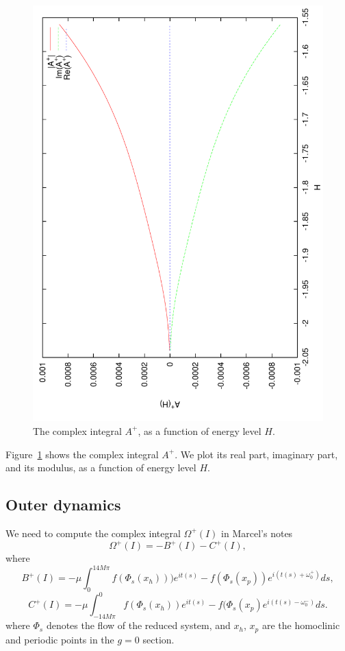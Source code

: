 \documentclass[a4paper]{amsart}
\theoremstyle{remark}
\begin{document}
\begin{figure}
\includegraphics[angle=-90,width=\textwidth]{figs/inner_ell}
\caption{The complex integral $A^+$, as a function of energy level
$H$.}
\label{fig:inner_ell}
\end{figure}

Figure~\ref{fig:inner_ell} shows the complex integral $A^+$. We plot
its real part, imaginary part, and its modulus, as a function of
energy level $H$.

\subsection{Outer dynamics}

We need to compute the complex integral $\Omega^+(I)$ in Marcel's notes
\[ \Omega^+(I) = -B^+(I) - C^+(I), \]
where 
\[ B^+(I) = -\mu \int_0^{14M\pi} 
   f(\Phi_s(x_h))) e^{it(s)} - f(\Phi_s(x_p)) e^{i(t(s)+\omega_0^+)} ds, \]
\[ C^+(I) = -\mu \int_{-14M\pi}^0
   f(\Phi_s(x_h)) e^{it(s)} - f(\Phi_s(x_p) e^{i(t(s)-\omega_0^-)} ds. \]
where $\Phi_s$ denotes the flow of the reduced system, and
$x_h$, $x_p$ are the homoclinic and periodic points in the $g=0$ section.
\end{document}

